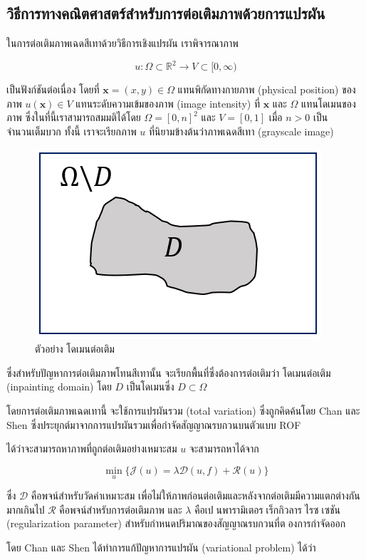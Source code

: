 \documentclass[hidelinks,a4paper,14pt]{article}
\numberwithin{equation}{section}							%
\begin{document}
{		\subsection{วิธีการทางคณิตศาสตร์สำหรับการต่อเติมภาพด้วยการแปรผัน}
		ในการต่อเติมภาพเฉดสีเทาด้วยวิธีการเชิงแปรผัน เราพิจารณาภาพ
		
		$$ u : \Omega \subset \mathbb{R}^2 \rightarrow V \subset [0,\infty) $$
		
		เป็นฟังก์ชันต่อเนื่อง โดยที่ $ \mathbf{x} = (x,y) \in \Omega $ แทนพิกัดทางกายภาพ (physical position) ของภาพ $ u(\mathbf{x}) \in V $ แทนระดับความเข้มของภาพ (image intensity) ที่ $ \mathbf{x} $ และ $ \Omega $ แทนโดเมนของภาพ ซึ่งในที่นี้เราสามารถสมมติได้โดย $ \Omega = [0,n]^2 $ และ $ V = [0,1] $ เมื่อ $n>0$ เป็นจำนวนเต็มบวก ทั้งนี้ เราจะเรียกภาพ $u$ ที่นิยามข้างต้นว่าภาพเฉดสีเทา (grayscale image)
			\begin{figure}[H]
			\centering
			\includegraphics[width=0.4\linewidth]{images/sample-domain.png}
			\caption{ตัวอย่าง โดเมนต่อเติม}
		\end{figure}
		ซึ่งสำหรับปัญหาการต่อเติมภาพโทนสีเทานั้น จะเรียกพื้นที่ซึ่งต้องการต่อเติมว่า โดเมนต่อเติม (inpainting domain) โดย $D$ เป็นโดเมนซึ่ง $D \subset \Omega$ 
		
		โดยการต่อเติมภาพเฉดเทานี้ จะใช้การแปรผันรวม (total variation) ซึ่งถูกคิดค้นโดย Chan และ Shen \cite{ref:rof-inpaint-chan-shen} ซึ่งประยุกต์มาจากการแปรผันรวมเพื่อกำจัดสัญญาณรบกวนบนตัวแบบ ROF \cite{ref:ROF-template}
		
		ได้ว่าจะสามารถหาภาพที่ถูกต่อเติมอย่างเหมาะสม $u$ จะสามารถหาได้จาก
		
			$$\min_{u} \{ \mathcal{J}(u)= \lambda \mathcal{D}(u,f)+  \mathcal{R}(u) \}$$
		
		ซึ่ง $ \mathcal{D} $ คือพจน์สำหรับวัดค่าเหมาะสม เพื่อไม่ให้ภาพก่อนต่อเติมและหลังจากต่อเติมมีความแตกต่างกันมากเกินไป $ \mathcal{R} $ คือพจน์สำหรับการต่อเติมภาพ และ $ \lambda $  คือเปนพารามิเตอรเร็กกิวลารไรซเซชัน (regularization parameter) สำหรับกำหนดปริมาณของสัญญาณรบกวนที่ตองการกำจัดออก 
		
		โดย Chan และ Shen ได้ทำการแก้ปัญหาการแปรผัน (variational problem) ได้ว่า
		
}
\end{document}
